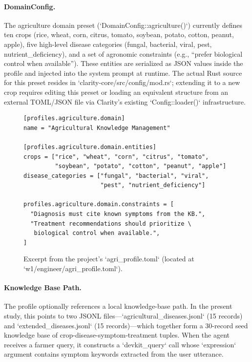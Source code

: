 \paragraph{DomainConfig.} The agriculture domain preset (`DomainConfig::agriculture()`) currently defines ten crops (rice, wheat, corn, citrus, tomato, soybean, potato, cotton, peanut, apple), five high-level disease categories (fungal, bacterial, viral, pest, nutrient\_deficiency), and a set of agronomic constraints (e.g., ``prefer biological control when available''). These entities are serialized as JSON values inside the profile and injected into the system prompt at runtime. The actual Rust source for this preset resides in `clarity-core/src/config/mod.rs`; extending it to a new crop requires editing this preset or loading an equivalent structure from an external TOML/JSON file via Clarity's existing `Config::loader()` infrastructure.

\begin{figure}[htbp]
\centering
\begin{minipage}{0.85\linewidth}
\begin{verbatim}
[profiles.agriculture.domain]
name = "Agricultural Knowledge Management"

[profiles.agriculture.domain.entities]
crops = ["rice", "wheat", "corn", "citrus", "tomato",
         "soybean", "potato", "cotton", "peanut", "apple"]
disease_categories = ["fungal", "bacterial", "viral",
                      "pest", "nutrient_deficiency"]

profiles.agriculture.domain.constraints = [
  "Diagnosis must cite known symptoms from the KB.",
  "Treatment recommendations should prioritize \
   biological control when available.",
]
\end{verbatim}
\end{minipage}
\caption{Excerpt from the project's `agri\_profile.toml` (located at `w1/engineer/agri\_profile.toml`).}
\label{lst:profile}
\end{figure}

\paragraph{Knowledge Base Path.} The profile optionally references a local knowledge-base path. In the present study, this points to two JSONL files---`agricultural\_diseases.jsonl` (15 records) and `extended\_diseases.jsonl` (15 records)---which together form a 30-record seed knowledge base of crop-disease-symptom-treatment tuples. When the agent receives a farmer query, it constructs a `devkit\_query` call whose `expression` argument contains symptom keywords extracted from the user utterance.

